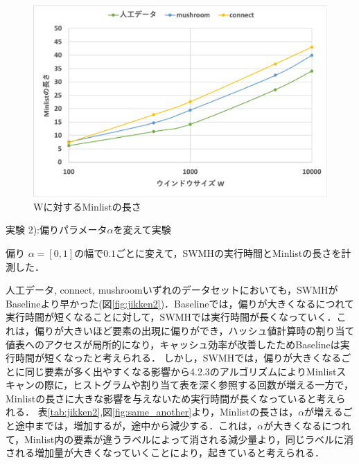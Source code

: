       \begin{figure}[h]
  \centering
  \includegraphics[width=14cm]{jikken1_SW.png}
    \caption{Wに対するMinlistの長さ}
    \label{fig:jikken1_ML}
\end{figure}


実験 2):偏りパラメータ$\alpha$を変えて実験

偏り $\alpha = [0,1]$の幅で$0.1$ごとに変えて，SWMHの実行時間とMinlistの長さを計測した．%

人工データ, connect, mushroomいずれのデータセットにおいても，SWMHがBaselineより早かった(図\ref{fig:jikken2})．Baselineでは，偏りが大きくなるにつれて実行時間が短くなることに対して，SWMHでは実行時間が長くなっていく．これは，偏りが大きいほど要素の出現に偏りができ，ハッシュ値計算時の割り当て値表へのアクセスが局所的になり，キャッシュ効率が改善したためBaselineは実行時間が短くなったと考えられる．
しかし，SWMHでは，偏りが大きくなるごとに同じ要素が多く出やすくなる影響から4.2.3のアルゴリズムによりMinlistスキャンの際に，ヒストグラムや割り当て表を深く参照する回数が増える一方で，Minlistの長さに大きな影響を与えないため実行時間が長くなっていると考えられる．
表\ref{tab:jikken2},図\ref{fig:same_another}より，Minlistの長さは，$\alpha$が増えるごと途中までは，増加するが，途中から減少する．これは，$\alpha$が大きくなるにつれて，Minlist内の要素が違うラベルによって消される減少量より，同じラベルに消される増加量が大きくなっていくことにより，起きていると考えられる．

